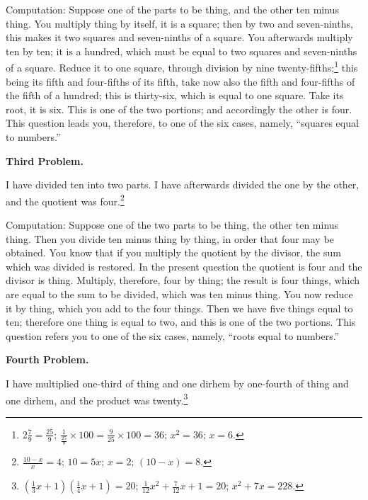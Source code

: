 Computation: Suppose one of the parts to be thing, and the other ten minus thing. You multiply thing by itself, it is a square; then by two and seven-ninths, this makes it two squares and seven-ninths of a square. You afterwards multiply ten by ten; it is a hundred, which must be equal to two squares and seven-ninths of a square. Reduce it to one square, through division by nine twenty-fifths;\footnote{$2\frac{7}{9} = \frac{25}{9}$; $\frac{1}{\frac{25}{9}} \times 100 = \frac{9}{25} \times 100 = 36$; $x^2 = 36$; $x = 6$.} this being its fifth and four-fifths of its fifth, take now also the fifth and four-fifths of the fifth of a hundred; this is thirty-six, which is equal to one square. Take its root, it is six. This is one of the two portions; and accordingly the other is four. This question leads you, therefore, to one of the six cases, namely, ``squares equal to numbers.''

\vspace{0.3cm}
\noindent\textbf{Third Problem.}

I have divided ten into two parts. I have afterwards divided the one by the other, and the quotient was four.\footnote{$\frac{10-x}{x} = 4$; $10 = 5x$; $x = 2$; $(10-x) = 8$.}

Computation: Suppose one of the two parts to be thing, the other ten minus thing. Then you divide ten minus thing by thing, in order that four may be obtained. You know that if you multiply the quotient by the divisor, the sum which was divided is restored. In the present question the quotient is four and the divisor is thing. Multiply, therefore, four by thing; the result is four things, which are equal to the sum to be divided, which was ten minus thing. You now reduce it by thing, which you add to the four things. Then we have five things equal to ten; therefore one thing is equal to two, and this is one of the two portions. This question refers you to one of the six cases, namely, ``roots equal to numbers.''

\vspace{0.3cm}
\noindent\textbf{Fourth Problem.}

I have multiplied one-third of thing and one dirhem by one-fourth of thing and one dirhem, and the product was twenty.\footnote{$(\frac{1}{3}x + 1)(\frac{1}{4}x + 1) = 20$; $\frac{1}{12}x^2 + \frac{7}{12}x + 1 = 20$; $x^2 + 7x = 228$.}

